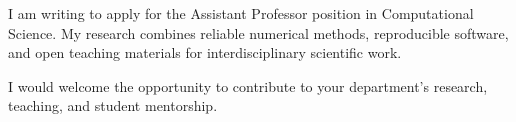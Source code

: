 \documentclass[family=academic]{careerdossier-letter}
\begin{document}
\MakeCDossierLetterhead

I am writing to apply for the Assistant Professor position in Computational
Science. My research combines reliable numerical methods, reproducible software,
and open teaching materials for interdisciplinary scientific work.

I would welcome the opportunity to contribute to your department's research,
teaching, and student mentorship.

\MakeCDossierClosing
\end{document}

